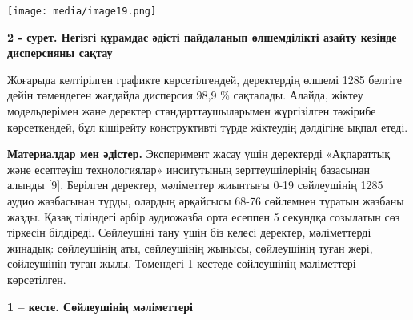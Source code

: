 \documentclass[
]{article}
\begin{document}
\texttt{[image: media/image19.png]}

\textbf{2 - сурет. Негізгі құрамдас әдісті пайдаланып өлшемділікті
азайту кезінде дисперсияны сақтау}

Жоғарыда келтірілген графикте көрсетілгендей, деректердің өлшемі 1285
белгіге дейін төмендеген жағдайда дисперсия 98,9 \% сақталады. Алайда,
жіктеу модельдерімен және деректер стандарттаушыларымен жүргізілген
тәжірибе көрсеткендей, бұл кішірейту конструктивті түрде жіктеудің
дәлдігіне ықпал етеді.

\textbf{Материалдар мен әдістер.} Эксперимент жасау үшін деректерді
«Ақпараттық және есептеуіш технологиялар» инситутының зерттеушілерінің
базасынан алынды {[}9{]}. Берілген деректер, мәліметтер жиынтығы 0-19
сөйлеушінің 1285 аудио жазбасынан тұрды, олардың әрқайсысы 68-76
сөйлемнен тұратын жазбаны жазды. Қазақ тіліндегі әрбір аудиожазба орта
есеппен 5 секундқа созылатын сөз тіркесін білдіреді. Сөйлеушіні тану
үшін біз келесі деректер, мәліметтерді жинадық: сөйлеушінің аты,
сөйлеушінің жынысы, сөйлеушінің туған жері, сөйлеушінің туған жылы.
Төмендегі 1 кестеде сөйлеушінің мәліметтері көрсетілген.

\textbf{1 -- кесте. Сөйлеушінің мәліметтері}
\end{document}

